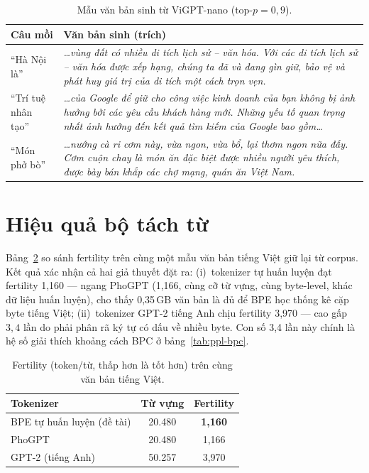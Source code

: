\begin{table}[H]
	\centering
	\caption{Mẫu văn bản sinh từ ViGPT-nano (top-$p = 0{,}9$).}
	\label{tab:samples}
	\begin{tabularx}{\textwidth}{lX}
		\hline
		\textbf{Câu mồi} & \textbf{Văn bản sinh (trích)} \\
		\hline
		``Hà Nội là'' & \emph{\ldots vùng đất có nhiều di tích lịch sử -- văn hóa. Với các di tích lịch sử -- văn hóa được xếp hạng, chúng ta đã và đang gìn giữ, bảo vệ và phát huy giá trị của di tích một cách trọn vẹn.} \\
		``Trí tuệ nhân tạo'' & \emph{\ldots của Google để giữ cho công việc kinh doanh của bạn không bị ảnh hưởng bởi các yêu cầu khách hàng mới. Những yếu tố quan trọng nhất ảnh hưởng đến kết quả tìm kiếm của Google bao gồm\ldots} \\
		``Món phở bò'' & \emph{\ldots nướng cà ri cơm này, vừa ngon, vừa bổ, lại thơm ngon nữa đấy. Cơm cuộn chay là món ăn đặc biệt được nhiều người yêu thích, được bày bán khắp các chợ mạng, quán ăn Việt Nam.} \\
		\hline
	\end{tabularx}
\end{table}

\section{Hiệu quả bộ tách từ}
\label{sec:exp-tokenizer}

Bảng~\ref{tab:fertility} so sánh fertility trên cùng một mẫu văn bản tiếng
Việt giữ lại từ corpus. Kết quả xác nhận cả hai giả thuyết đặt ra:
(i)~tokenizer tự huấn luyện đạt fertility 1,160 --- ngang PhoGPT (1,166, cùng
cỡ từ vựng, cùng byte-level, khác dữ liệu huấn luyện), cho thấy 0,35\,GB văn
bản là đủ để BPE học thống kê cặp byte tiếng Việt; (ii)~tokenizer GPT-2 tiếng
Anh chịu fertility 3,970 --- cao gấp $3{,}4$ lần do phải phân rã ký tự có dấu
về nhiều byte. Con số 3,4 lần này chính là hệ số giải thích khoảng cách BPC ở
bảng~\ref{tab:ppl-bpc}.

\begin{table}[H]
	\centering
	\caption{Fertility (token/từ, thấp hơn là tốt hơn) trên cùng văn bản tiếng Việt.}
	\label{tab:fertility}
	\begin{tabular}{lcc}
		\hline
		\textbf{Tokenizer} & \textbf{Từ vựng} & \textbf{Fertility} \\
		\hline
		BPE tự huấn luyện (đề tài) & 20.480 & \textbf{1,160} \\
		PhoGPT \autocite{nguyen2023phogpt} & 20.480 & 1,166 \\
		GPT-2 (tiếng Anh) \autocite{radford2019gpt2} & 50.257 & 3,970 \\
		\hline
	\end{tabular}
\end{table}

